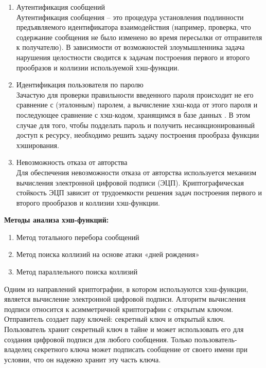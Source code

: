 \begin{enumerate} 
\item Аутентификация сообщений \\
Аутентификация сообщения – это процедура установления подлинности предъявляемого идентификатора взаимодействия (например, проверка, что содержание сообщения не было изменено во время пересылки от отправителя к получателю). В зависимости от возможностей злоумышленника задача нарушения целостности сводится к задачам построения первого и второго прообразов и коллизии используемой хэш-функции.
\item Идентификация пользователя по паролю \\
Зачастую для проверки правильности введенного пароля происходит не его сравнение с (эталонным) паролем, а вычисление хэш-кода от этого пароля и последующее сравнение с хэш-кодом, хранящимся в базе данных \cite{hash_password}. В этом случае для того, чтобы подделать пароль и получить несанкционированный доступ к ресурсу, необходимо решить задачу построения прообраза функции хэширования. 
\item Невозможность отказа от авторства \\
Для обеспечения невозможности отказа от авторства используется механизм вычисления электронной цифровой подписи (ЭЦП). Криптографическая стойкость ЭЦП зависит от трудоемкости решения задач построения первого и второго прообразов и коллизии хэш-функции.
\end{enumerate}

\textbf{Методы анализа хэш-функций:}
\begin{enumerate} 
\item Метод тотального перебора сообщений  
\item Метод поиска коллизий на основе атаки «дней рождения» \cite{birthday_attack}
\item Метод параллельного поиска коллизий \cite{parallel_col}
\end{enumerate}

Одним из направлений криптографии, в котором используются хэш-функции, является вычисление электронной цифровой подписи. Алгоритм вычисления подписи относится к асимметричной криптографии с открытым ключом. Отправитель создает пару ключей: секретный ключ и открытый ключ. Пользователь хранит секретный ключ в тайне и может использовать его для создания цифровой подписи для любого сообщения. Только пользователь-владелец секретного ключа может подписать сообщение от своего имени при условии, что он надежно хранит эту часть ключа. 

